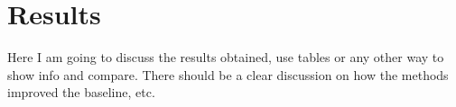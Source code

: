 \section{Results}
\label{sec:results}
Here I am going to discuss the results obtained, use tables or any other way to show info and compare.
There should be a clear discussion on how the methods improved the baseline, etc.